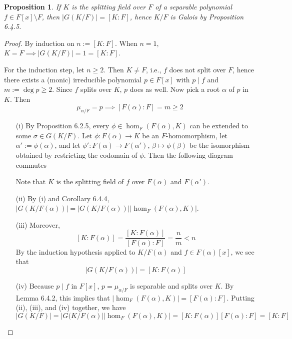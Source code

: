 \documentclass[11pt]{book}
\newcounter{counter}
\newtheorem{proposition}[counter]{Proposition}   \newtheorem{problem}[counter]{Problem}   \newtheorem*{proposition*}{Proposition}   \newtheorem*{lemma*}{Lemma}
\theoremstyle{definition}   \newtheorem{defn}[counter]{Definition} %
\newcommand{\bs}{\setminus}   \newcommand{\A}{\mathcal{A}}   \newcommand{\sy}{\textnormal{Syl}}   \newcommand{\size}[1]{\left| #1 \right|}
\DeclareMathOperator{\ra}{\rightarrow}   \DeclareMathOperator{\Poly}{\mathbf{P}}   \DeclareMathOperator{\spn}{\textnormal{span}}   \DeclareMathOperator{\aut}{\textnormal{Aut}}
\newcommand{\vs}{\vspace{8pt}}   \newcommand{\hs}{\hspace{8pt}}
\numberwithin{counter}{chapter}
\begin{document}
\vs

\begin{proposition}
If $K$ is the splitting field over $F$ of a separable polynomial $f \in F[x] \bs F$, then $|G(K/F)| = [K : F]$, hence $K/F$ is Galois by Proposition 6.4.5. 
\end{proposition}

\begin{proof}
By induction on $n := [K : F]$. When $n = 1$, $K = F \implies |G(K/F)| = 1 = [K : F]$.

For the induction step, let $n \geq 2$. Then $K \ne F$, i.e., $f$ does not split over $F$, hence there exists a (monic) irreducible polynomial $p \in F[x]$ with $p \mid f$ and $m := \deg p \geq 2$. Since $f$ splits over $K$, $p$ does as well. Now pick a root $\alpha$ of $p$ in $K$. Then 
	\[\mu_{\alpha/F} = p \implies [F(\alpha) : F] = m \geq 2 \]
\begin{enumerate}
\item[(i)] By Proposition 6.2.5, every $\phi \in \hom_F(F(\alpha),K)$ can be extended to some $\sigma \in G(K/F)$. Let $\phi : F(\alpha) \ra K$ be an $F$-homomorphism, let $\alpha' := \phi(\alpha)$, and let $\phi' : F(\alpha) \ra F(\alpha')$, $\beta \mapsto \phi(\beta)$ be the isomorphism obtained by restricting the codomain of $\phi$. Then the following diagram commutes
\begin{center}
\end{center}
Note that $K$ is the splitting field of $f$ over $F(\alpha)$ and $F(\alpha')$. 
\item[(ii)] By (i) and Corollary 6.4.4, $|G(K/F(\alpha))| = |G(K/F(\alpha))| |\hom_F(F(\alpha),K)|$. 
\item[(iii)] Moreover,
	\[[K : F(\alpha)] = \frac{[K : F(\alpha)]}{[F(\alpha) : F]} = \frac{n}{m} < n \tag{$m \geq 2$}\]
By the induction hypothesis applied to $K/F(\alpha)$ and $f \in F(\alpha)[x]$, we see that  	
	\[|G(K/F(\alpha))| = [K : F(\alpha)] \]
\item[(iv)] Because $p \mid f$ in $F[x]$, $p=\mu_{\alpha/F}$ is separable and splits over $K$. By Lemma 6.4.2, this implies that $|\hom_F(F(\alpha),K)| = [F(\alpha) : F]$. Putting (ii), (iii), and (iv) together, we have
	\[|G(K/F)| = |G(K/F(\alpha)| |\hom_F(F(\alpha),K)| = [K : F(\alpha)] [F(\alpha) : F] = [K : F] \]
\end{enumerate}
\end{proof}
\end{document}
